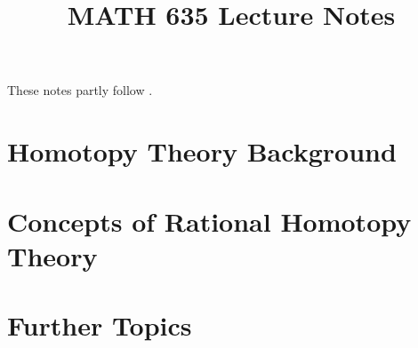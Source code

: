 \documentclass[12pt]{amsart}
\title{MATH 635 Lecture Notes}
\theoremstyle{definition}
\theoremstyle{remark}
\begin{document}
	
	
	
	\newpage
	\begin{center}
		\vspace*{\fill}
		These notes partly follow \cite{griffiths_rational_2013}.
		\vspace*{\fill}
	\end{center}
	
	\newpage
	
	\tableofcontents
	
	\newpage
	\part{Homotopy Theory Background}

	
	
	
	
	
	
	
	
	
	\part{Concepts of Rational Homotopy Theory}
	\part{Further Topics}
	
	\newpage
	
	
\end{document}
